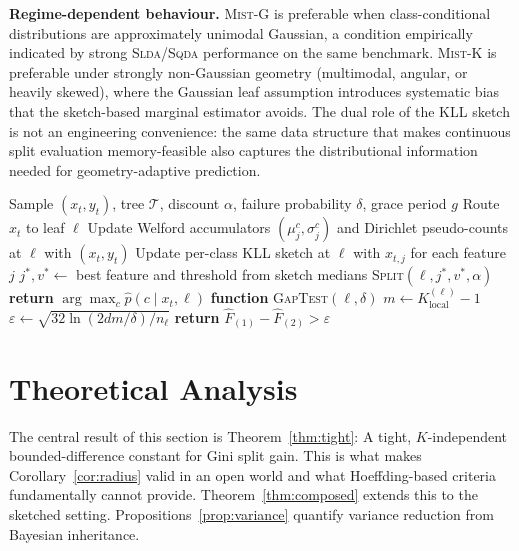 \documentclass{article}
\newcommand{\mist}{\textsc{Mist}}
\newcommand{\slda}{\textsc{Slda}}
\newcommand{\sqda}{\textsc{Sqda}}
\begin{document}
\noindent
\textbf{Regime-dependent behaviour.}
\mist{}-G is preferable when class-conditional distributions are
approximately unimodal Gaussian, a condition empirically indicated by
strong \slda{}/\sqda{} performance on the same benchmark. \mist{}-K
is preferable under strongly non-Gaussian geometry (multimodal, angular,
or heavily skewed), where the Gaussian leaf assumption introduces
systematic bias that the sketch-based marginal estimator avoids.
The dual role of the KLL sketch is not an engineering convenience: 
the same data structure that makes continuous split evaluation 
memory-feasible also captures the distributional information needed for 
geometry-adaptive prediction.
\begin{algorithm}[t]
\caption{\mist{}: Update and Predict}
\label{alg:mist}
\begin{algorithmic}[1]
\REQUIRE Sample $(x_t, y_t)$, tree $\mathcal{T}$, discount $\alpha$,
         failure probability $\delta$, grace period $g$
\STATE Route $x_t$ to leaf $\ell$
\STATE Update Welford accumulators $(\mu_j^c, \sigma_j^c)$ and Dirichlet
       pseudo-counts at $\ell$ with $(x_t, y_t)$
\STATE Update per-class KLL sketch at $\ell$ with $x_{t,j}$ for each
       feature $j$
  \STATE $j^*, v^* \leftarrow$ best feature and threshold from sketch medians
  \STATE \textsc{Split}$(\ell, j^*, v^*, \alpha)$
\ENDIF
\STATE \textbf{return} $\arg\max_c \hat{p}(c \mid x_t, \ell)$
\STATE
\STATE \textbf{function} \textsc{GapTest}$(\ell, \delta)$
\STATE \quad $m \leftarrow K_{\mathrm{local}}^{(\ell)} - 1$
\STATE \quad $\varepsilon \leftarrow \sqrt{32\ln(2dm/\delta)/n_\ell}$
\STATE \quad \textbf{return} $\widehat{F}_{(1)} - \widehat{F}_{(2)} > \varepsilon$
\end{algorithmic}
\end{algorithm}

\section{Theoretical Analysis}
\label{sec:theory}
The central result of this section is Theorem~\ref{thm:tight}: A tight,
$K$-independent bounded-difference constant for Gini split gain.
This is what makes Corollary~\ref{cor:radius} valid in an open world
and what Hoeffding-based criteria fundamentally cannot provide.
Theorem~\ref{thm:composed} extends this to the sketched setting.
Propositions~\ref{prop:variance}
quantify variance reduction from Bayesian inheritance.
\end{document}
